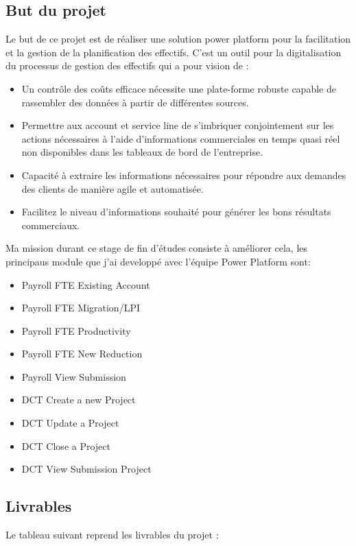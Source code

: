 \subsection{But du projet}

Le but de ce projet est de réaliser une solution power platform pour la facilitation et la gestion de la planification des effectifs. C’est un outil pour la digitalisation du processus de gestion des effectifs qui a pour vision de :

\begin{itemize}
  \item Un contrôle des coûts efficace nécessite une plate-forme robuste capable de rassembler des données à partir de différentes sources.
  \item Permettre aux account et service line de s'imbriquer conjointement sur les actions nécessaires à l'aide d'informations commerciales en temps quasi réel non disponibles dans les tableaux de bord de l'entreprise.
  \item Capacité à extraire les informations nécessaires pour répondre aux demandes des clients de manière agile et automatisée.
  \item Facilitez le niveau d'informations souhaité pour générer les bons résultats commerciaux.
\end{itemize}

Ma mission durant ce stage de fin d’études consiste à améliorer cela, les principaus module que j'ai developpé avec l'équipe Power Platform sont:
\\
\begin{itemize}
  \item Payroll FTE Existing Account
  \item Payroll FTE Migration/LPI
  \item Payroll FTE Productivity
  \item Payroll FTE New Reduction
  \item Payroll View Submission
  \item DCT Create a new Project
  \item DCT Update a Project
  \item DCT Close  a  Project
  \item DCT View Submission Project
\end{itemize}

\subsection{Livrables}
Le tableau suivant reprend les livrables du projet :

